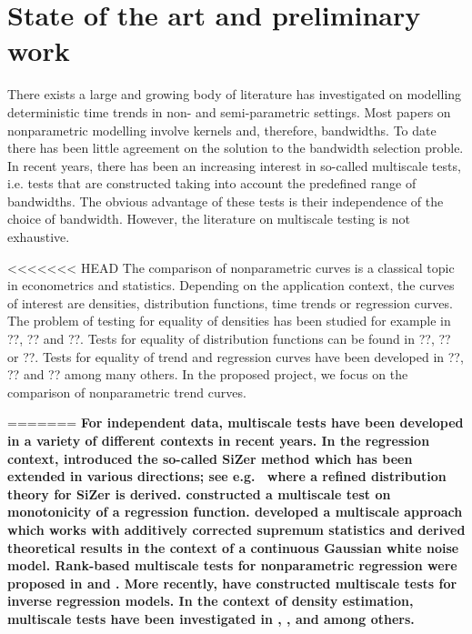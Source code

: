 \documentclass[a4paper,12pt]{article}
\begin{document}



\section{State of the art and preliminary work}

There exists a large and growing body of literature has investigated on modelling deterministic time trends in non- and semi-parametric settings. Most papers on nonparametric modelling involve kernels and, therefore, bandwidths. To date there has been little agreement on the solution to the bandwidth selection proble. In recent years, there has been an increasing interest in so-called multiscale tests, i.e. tests that are constructed  taking into account the predefined range of bandwidths. The obvious advantage of these tests is their independence of the choice of bandwidth. However, the literature on multiscale testing is not exhaustive.

<<<<<<< HEAD
The comparison of nonparametric curves is a classical topic in econometrics and statistics. Depending on the application context, the curves of interest are densities, distribution functions, time trends or regression curves. The problem of testing for equality of densities has been studied for example in ??, ?? and ??. Tests for equality of distribution functions can be found in ??, ?? or ??. Tests for equality of trend and regression curves have been developed in ??, ?? and ?? among many others. In the proposed project, we focus on the comparison of nonparametric trend curves.

=======
{\bf For independent data, multiscale tests have been developed in a variety of different contexts in recent years. In the regression context, \cite{ChaudhuriMarron1999,ChaudhuriMarron2000} introduced the so-called SiZer method which has been extended in various directions; see e.g.\ \cite{HannigMarron2006} where a refined distribution theory for SiZer is derived. \cite{HallHeckman2000} constructed a multiscale test on monotonicity of a regression function. \cite{DuembgenSpokoiny2001} developed a multiscale approach which works with additively corrected supremum statistics and derived theoretical results in the context of a continuous Gaussian white noise model. Rank-based multiscale tests for nonparametric regression were proposed in \cite{Duembgen2002} and \cite{Rohde2008}. More recently, \cite{ProkschWernerMunk2018} have constructed multiscale tests for inverse regression models. In the context of density estimation, multiscale tests have been investigated in \cite{DuembgenWalther2008}, \cite{RufibachWalther2010}, \cite{SchmidtHieber2013} and \cite{EckleBissantzDette2017} among others.}
\end{document}
